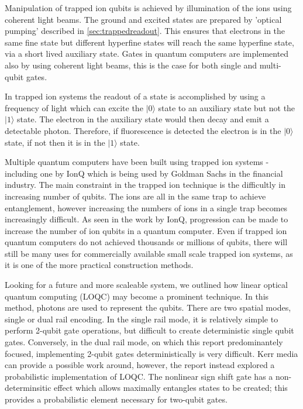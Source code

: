 Manipulation of trapped ion qubits is achieved by illumination of the ions using coherent light beams.
The ground and excited states are prepared by 'optical pumping' described in \cref{sec:trappedreadout}.
This ensures that electrons in the same fine state but different hyperfine states will reach the same hyperfine state, via a short lived auxiliary state.
Gates in quantum computers are implemented also by using coherent light beams, this is the case for both single and multi-qubit gates.

In trapped ion systems the readout of a state is accomplished by using a frequency of light which can excite the $|0\rangle$ state to an auxiliary state but not the $|1\rangle$ state. The electron in the auxiliary state would then decay and emit a detectable photon. Therefore, if fluorescence is detected the electron is in the $|0\rangle $ state, if not then it is in the $|1\rangle$ state. 

Multiple quantum computers have been built using trapped ion systems - including one by IonQ which is being used by Goldman Sachs in the financial industry. \cite{noauthor_goldman_2021} 
The main constraint in the trapped ion technique is the difficultly in increasing number of qubits. The ions are all in the same trap to achieve entanglement, however increasing the numbers of ions in a single trap becomes increasingly difficult. As seen in the work by IonQ, progression can be made to increase the number of ion qubits in a quantum computer. Even if trapped ion quantum computers do not achieved thousands or millions of qubits, there will still be many uses for commercially available small scale trapped ion systems, as it is one of the more practical construction methods.

Looking for a future and more scaleable system, we outlined how linear optical quantum computing (LOQC) may become a prominent technique. In this method, photons are used to represent the qubits. There are two spatial modes, single or dual rail encoding. In the single rail mode, it is relatively simple to perform 2-qubit gate operations, but difficult to create deterministic single qubit gates. Conversely, in the dual rail mode, on which this report predominantely focused, implementing 2-qubit gates deterministically is very difficult. Kerr media can provide a possible work around, however, the report instead explored a probabilistic implementation of LOQC. The nonlinear sign shift gate has a non-determinsitic effect which allows maximally entangles states to be created; this provides a probabilistic element necessary for two-qubit gates.


